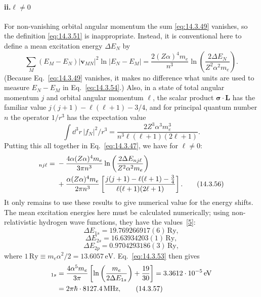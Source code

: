 \paragraph{ii.\quad $\ell\ne0$}
For non-vanishing orbital angular momentum the sum \eqref{eq:14.3.49}
vanishes, so the definition \eqref{eq:14.3.51} is inappropriate. Instead, it
is conventional here to define a mean excitation energy $\Delta E_N$ by
\begin{equation}
\sum_M(E_M-E_N)|\mathbf v_{MN}|^2\ln|E_N-E_M|
=\frac{2(Z\alpha)^4m_e}{n^3}\ln\left(
\frac{2\Delta E_N}{Z^2\alpha^2m_e}\right).
\tag{14.3.54}\label{eq:14.3.54}
\end{equation}
(Because Eq.~\eqref{eq:14.3.49} vanishes, it makes no difference what units
are used to measure $E_N-E_M$ in Eq.~\eqref{eq:14.3.54}.) Also, in a state of
total angular momentum $j$ and orbital angular momentum $\ell$, the scalar
product $\boldsymbol\sigma\cdot\mathbf L$ has the familiar value
$j(j+1)-\ell(\ell+1)-3/4$, and for principal quantum number $n$ the operator
$1/r^3$ has the expectation value
\begin{equation}
\int \dd^3r\,|f_N|^2/r^3
=\frac{2Z^3\alpha^3m_e^3}{n^3\ell(\ell+1)(2\ell+1)}.
\tag{14.3.55}\label{eq:14.3.55}
\end{equation}
Putting this all together in Eq.~\eqref{eq:14.3.47}, we have for $\ell\ne0$:
\begin{align}
[\delta E]_{nj\ell}={}&-\frac{4\alpha(Z\alpha)^4m_e}{3\pi n^3}
\ln\left(\frac{2\Delta E_{nj\ell}}{Z^2\alpha^2m_e}\right)\notag\\
&+\frac{\alpha(Z\alpha)^4m_e}{2\pi n^3}
\left[\frac{j(j+1)-\ell(\ell+1)-\tfrac34}
{\ell(\ell+1)(2\ell+1)}\right].
\tag{14.3.56}\label{eq:14.3.56}
\end{align}
It only remains to use these results to give numerical value for the energy
shifts. The mean excitation energies here must be calculated numerically;
using non-relativistic hydrogen wave functions, they have the
values~\hyperlink{ref:14.5}{[5]}:
\[
\Delta E_{1s}=19.769266917(6)\,\mathrm{Ry},
\]
\[
\Delta E_{2s}=16.63934203(1)\,\mathrm{Ry},
\]
\[
\Delta E_{2p}=0.9704293186(3)\,\mathrm{Ry},
\]
where $1\,\mathrm{Ry}\equiv m_e\alpha^2/2=13.6057\,\mathrm{eV}$.
Eq.~\eqref{eq:14.3.53} then gives
\begin{align}
[\delta E]_{1s}
&=\frac{4\alpha^5m_e}{3\pi}
\left[\ln\left(\frac{m_e}{2\Delta E_{1s}}\right)+\frac{19}{30}\right]
=3.3612\cdot10^{-5}\,\mathrm{eV}\notag\\
&=2\pi\hbar\cdot8127.4\,\mathrm{MHz},
\tag{14.3.57}\label{eq:14.3.57}
\end{align}

